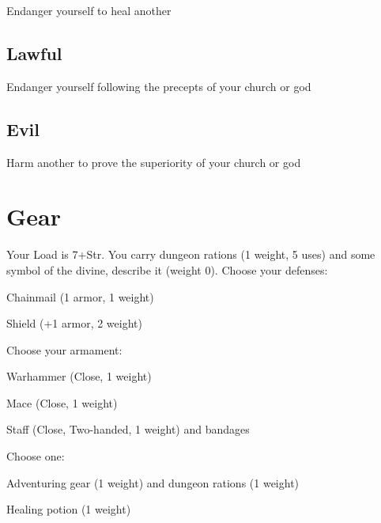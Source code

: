 Endanger yourself to heal another

 
\subsection{Lawful}   
 

Endanger yourself following the precepts of your church or god

 
\subsection{Evil}   
 

Harm another to prove the superiority of your church or god



 
\section{Gear}   
 



Your Load is 7+Str. You carry dungeon rations (1 weight, 5 uses) and some symbol of the divine, describe it (weight 0). Choose your defenses:

 
\startitemize[1,packed]

\item Chainmail (1 armor, 1 weight)

 
\item Shield (+1 armor, 2 weight)


\stopitemize
 

Choose your armament:

 
\startitemize[1,packed]

\item Warhammer (Close, 1 weight)

 
\item Mace (Close, 1 weight)

 
\item Staff (Close, Two-handed, 1 weight) and bandages


\stopitemize
 

Choose one:

 
\startitemize[1,packed]

\item Adventuring gear (1 weight) and dungeon rations (1 weight)

 
\item Healing potion (1 weight)


\stopitemize


